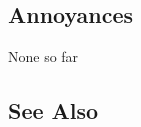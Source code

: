 %
%
%
%

\subsection[Annoyances]{Annoyances}\label{annoyances}

None so far

\subsection[See Also]{See Also}\label{see-also}

